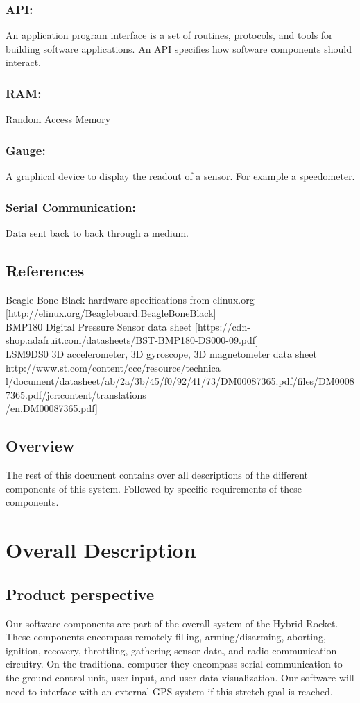 \documentclass[10pt,draftclsnofoot,onecolumn,compsoc]{IEEEtran}
\begin{document}
\subsubsection{\bf API:}An application program interface is a set of routines, protocols, and tools for building software applications. An API specifies how software components should interact.
\subsubsection{\bf RAM:}Random Access Memory
\subsubsection{\bf Gauge:}A graphical device to display the readout of a sensor. For example a speedometer.
\subsubsection{\bf Serial Communication:}Data sent back to back through a medium.

\subsection{ References}
Beagle Bone Black hardware specifications from elinux.org [http://elinux.org/Beagleboard:BeagleBoneBlack]\\
BMP180 Digital Pressure Sensor data sheet [https://cdn-shop.adafruit.com/datasheets/BST-BMP180-DS000-09.pdf]\\
LSM9DS0 3D accelerometer, 3D gyroscope, 3D magnetometer data sheet http://www.st.com/content/ccc/resource/technica\\l/document/datasheet/ab/2a/3b/45/f0/92/41/73/DM00087365.pdf/files/DM00087365.pdf/jcr:content/translations\\/en.DM00087365.pdf]
\subsection{Overview}
The rest of this document contains over all descriptions of the different components of this system. Followed by specific requirements of these components.

\section{ Overall Description}
\subsection{ Product perspective}
Our software components are part of the overall system of the Hybrid Rocket. These components encompass remotely filling, arming/disarming, aborting, ignition, recovery, throttling, gathering sensor data, and radio communication circuitry.  On the traditional computer they encompass serial communication to the ground control unit, user input, and user data visualization. Our software will need to interface with an external GPS system if this stretch goal is reached. 
\end{document}
